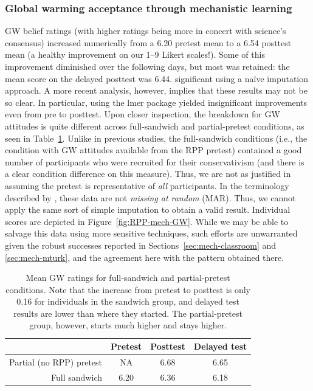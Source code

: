 \subsubsection{Global warming acceptance through mechanistic learning}

GW belief ratings (with higher ratings being more in concert with science’s
consensus) increased numerically from a 6.20 pretest mean to a 6.54 posttest
mean
(a healthy improvement on our 1--9 Likert scales!). Some of this improvement
diminished over the following days, but most was retained: the mean score on the
delayed posttest was 6.44.  %
significant using a naïve imputation approach. A more recent analysis, however,
implies that these results may not be so clear.  In particular, using the
\textsf{lmer} package yielded insignificant improvements even from pre to
posttest. Upon closer inspection, the breakdown for GW attitudes is quite
different across full-sandwich and partial-pretest conditions, as seen in
Table~\ref{table:RPP-mech-gw-breakdown}. Unlike in previous studies, the
full-sandwich conditions (i.e., the condition with GW attitudes available from the
RPP pretest) contained a good number of participants who were recruited for
their conservativism (and there is a clear condition difference on this measure).
Thus, we are not as justified in assuming the pretest is representative of
\emph{all} participants. In the terminology described by
\textcite{fox_applied_2008}, these data are not \emph{missing at random} (MAR).
Thus, we cannot apply the same sort of simple imputation to obtain a valid
result.  Individual scores are depicted in Figure~\ref{fig:RPP-mech-GW}. While
we may be able to salvage this data using more sensitive techniques, such
efforts are unwarranted given the robust successes reported in
Sections~\ref{sec:mech-classroom} and \ref{sec:mech-mturk}, and the agreement
here with the pattern obtained there.



\begin{table}[ht]
\centering
\caption{Mean GW ratings for full-sandwich and partial-pretest conditions. Note that the
    increase from pretest to posttest is only 0.16 for individuals in the
    sandwich group, and delayed test results are lower than where they started.
    The partial-pretest group, however, starts much higher and stays higher.}
\label{table:RPP-mech-gw-breakdown}
\begin{tabular}{rccc}
  \toprule
        & Pretest & Posttest & Delayed test \\ 
  \midrule
  Partial (no RPP) pretest & NA & 6.68 & 6.65 \\ 
  Full sandwich & 6.20 & 6.36 & 6.18 \\ 
   \bottomrule
\end{tabular}
\end{table}

